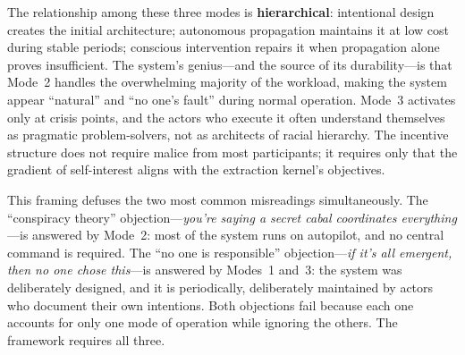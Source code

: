 The relationship among these three modes is \textbf{hierarchical}: intentional design creates the initial architecture; autonomous propagation maintains it at low cost during stable periods; conscious intervention repairs it when propagation alone proves insufficient. The system's genius---and the source of its durability---is that Mode~2 handles the overwhelming majority of the workload, making the system appear ``natural'' and ``no one's fault'' during normal operation. Mode~3 activates only at crisis points, and the actors who execute it often understand themselves as pragmatic problem-solvers, not as architects of racial hierarchy. The incentive structure does not require malice from most participants; it requires only that the gradient of self-interest aligns with the extraction kernel's objectives.

This framing defuses the two most common misreadings simultaneously. The ``conspiracy theory'' objection---\textit{you're saying a secret cabal coordinates everything}---is answered by Mode~2: most of the system runs on autopilot, and no central command is required. The ``no one is responsible'' objection---\textit{if it's all emergent, then no one chose this}---is answered by Modes~1 and~3: the system was deliberately designed, and it is periodically, deliberately maintained by actors who document their own intentions. Both objections fail because each one accounts for only one mode of operation while ignoring the others. The framework requires all three.

